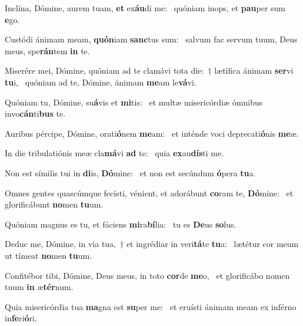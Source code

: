 \item Inclína, Dómine, aurem tuam, \textbf{et} ex\textbf{áu}di me:~\psstar{} quóniam inops, et \textbf{pau}per sum \textbf{e}go.

\item Custódi ánimam meam, \textbf{quón}iam \textbf{sanc}tus sum:~\psstar{} salvum fac servum tuum, Deus meus, spe\textbf{rán}tem \textbf{in} te.

\item Miserére mei, Dómine, quóniam ad te clamávi tota die:~† lætífica ánimam \textbf{ser}vi \textbf{tu}i,~\psstar{} quóniam ad te, Dómine, ánimam \textbf{me}am le\textbf{vá}vi.

\item Quóniam tu, Dómine, su\textbf{á}vis et \textbf{mi}tis:~\psstar{} et multæ misericórdiæ ómnibus invo\textbf{cán}ti\textbf{bus} te.

\item Auribus pércipe, Dómine, orati\textbf{ó}nem \textbf{me}am:~\psstar{} et inténde voci deprecati\textbf{ó}nis \textbf{me}æ.

\item In die tribulatiónis meæ cla\textbf{má}vi \textbf{ad} te:~\psstar{} quia \textbf{ex}au\textbf{dís}ti me.

\item Non est símilis tui in \textbf{di}is, \textbf{Dó}mine:~\psstar{} et non est secúndum \textbf{ó}pera \textbf{tu}a.

\item Omnes gentes quascúmque fecísti, vénient, et adorábunt \textbf{co}ram te, \textbf{Dó}mine:~\psstar{} et glorificábunt \textbf{no}men \textbf{tu}um.

\item Quóniam magnus es tu, et fáciens \textbf{mi}ra\textbf{bí}lia:~\psstar{} tu es \textbf{De}us \textbf{so}lus.

\item Deduc me, Dómine, in via tua,~† et ingrédiar in veri\textbf{tá}te \textbf{tu}a:~\psstar{} lætétur cor meum ut tímeat \textbf{no}men \textbf{tu}um.

\item Confitébor tibi, Dómine, Deus meus, in toto \textbf{cor}de \textbf{me}o,~\psstar{} et glorificábo nomen tuum \textbf{in} æ\textbf{tér}num.

\item Quia misericórdia tua \textbf{ma}gna est \textbf{su}per me:~\psstar{} et eruísti ánimam meam ex inférno in\textbf{fe}ri\textbf{ó}ri.

